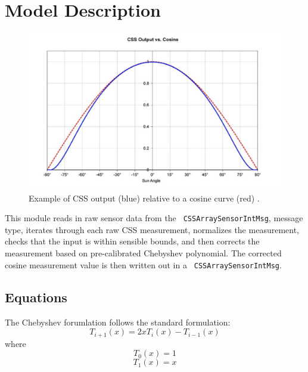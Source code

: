 
\section{Model Description}

\begin{figure}[H]
	\centerline{
		\includegraphics[scale=0.5]{Figures/CSSCalibration}
	}
	\caption{Example of CSS output (blue) relative to a cosine curve (red) \cite{CSS}.}
	\label{fig:CSSraw}
\end{figure}

This module reads in raw sensor data from the \verb. CSSArraySensorIntMsg., message type, iterates through each raw CSS measurement, normalizes the measurement, checks that the input is within sensible bounds, and then corrects the measurement based on pre-calibrated Chebyshev polynomial. The corrected cosine measurement value is then written out in a \verb. CSSArraySensorIntMsg.. 

\subsection{Equations}
The Chebyshev forumlation follows the standard formulation:
\begin{equation}
T_{i+1}(x) = 2xT_i(x) - T_{i-1}(x)
\end{equation}
where
\begin{equation}
T_0(x) = 1 
\end{equation}
\begin{equation}
T_1(x) = x
\end{equation}

